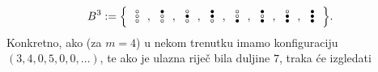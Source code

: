 \begin{equation}
\renewcommand{\arraystretch}{0.1}
    B^3:=\Bigl\{
    \begin{array}{c}
    \text\textopenbullet\\
    \text\textopenbullet\\
    \text\textopenbullet
    \end{array},
    \begin{array}{c}
    \text\textbullet\\
    \text\textopenbullet\\
    \text\textopenbullet
    \end{array},
    \begin{array}{c}
    \text\textopenbullet\\
    \text\textbullet\\
    \text\textopenbullet
    \end{array},
    \begin{array}{c}
    \text\textbullet\\
    \text\textbullet\\
    \text\textopenbullet
    \end{array},
    \begin{array}{c}
    \text\textopenbullet\\
    \text\textopenbullet\\
    \text\textbullet
    \end{array},
    \begin{array}{c}
    \text\textbullet\\
    \text\textopenbullet\\
    \text\textbullet
    \end{array},
    \begin{array}{c}
    \text\textopenbullet\\
    \text\textbullet\\
    \text\textbullet
    \end{array},
    \begin{array}{c}
    \text\textbullet\\
    \text\textbullet\\
    \text\textbullet
    \end{array}
    \Bigr\}\text.
\end{equation}
Konkretno, ako (za $m=4$) u nekom trenutku imamo konfiguraciju $(3,4,0,5,0,0,\dotsc)$, te ako je ulazna riječ bila duljine $7$, traka će izgledati
